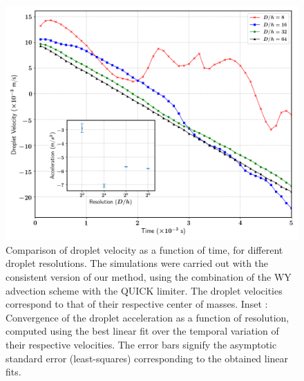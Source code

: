 \begin{figure}
\begin{center}
\includegraphics[width = 1.0\textwidth]{plots/raindrop/dropl_velocity_accel_ppd.png}
\end{center}
\vspace*{-0.5cm}
\caption{Comparison of droplet velocity as a function of time, 
for different droplet resolutions.
The simulations were carried out with the consistent version of our method,
using the combination of the WY advection scheme with the QUICK limiter. 
The droplet velocities correspond to that of their respective center of masses. 
Inset : Convergence of the droplet acceleration as a function of resolution, 
computed using the best linear fit over the temporal variation 
of their respective velocities. 
The error bars signify the asymptotic standard 
error (least-squares) corresponding to the obtained linear fits.} 
\label{drop_vel_caf}
\end{figure}

